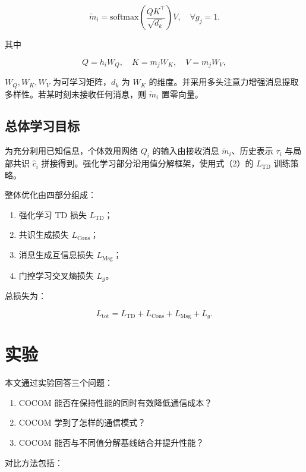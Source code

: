 \begin{equation}
\tilde m_i=\text{softmax}\!\left(\frac{QK^{\top}}{\sqrt{d_k}}\right)V,\quad \forall g_j=1.
\tag{15}
\end{equation}

其中

\[
Q=h_iW_Q,\quad K=m_jW_K,\quad V=m_jW_V,
\]

$W_Q,W_K,W_V$ 为可学习矩阵，$d_k$ 为 $W_K$ 的维度。并采用多头注意力增强消息提取多样性。若某时刻未接收任何消息，则 $\tilde m_i$ 置零向量。

\subsection*{总体学习目标}

为充分利用已知信息，个体效用网络 $Q_i$ 的输入由接收消息 $\tilde m_i$、历史表示 $\tau_i$ 与局部共识 $\hat c_i$ 拼接得到。强化学习部分沿用值分解框架，使用式（2）的 $L_{\text{TD}}$ 训练策略。

整体优化由四部分组成：

\begin{enumerate}
    \item 强化学习 TD 损失 $L_{\text{TD}}$；
    \item 共识生成损失 $L_{\text{Cons}}$；
    \item 消息生成互信息损失 $L_{\text{Msg}}$；
    \item 门控学习交叉熵损失 $L_g$。
\end{enumerate}

总损失为：

\begin{equation}
L_{\text{tot}}=L_{\text{TD}}+L_{\text{Cons}}+L_{\text{Msg}}+L_g.
\tag{16}
\end{equation}

\section*{实验}

本文通过实验回答三个问题：

\begin{enumerate}
    \item COCOM 能否在保持性能的同时有效降低通信成本？
    \item COCOM 学到了怎样的通信模式？
    \item COCOM 能否与不同值分解基线结合并提升性能？
\end{enumerate}

对比方法包括：

